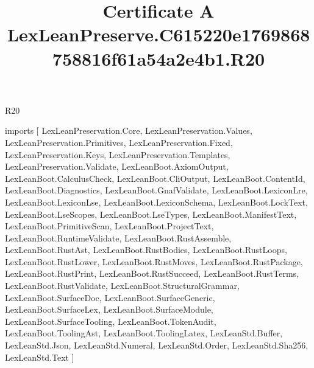 \begin{lexlean}{R20}
\title{Certificate A LexLeanPreserve.C615220e1769868758816f61a54a2e4b1.R20}
\begin{coremodule}
imports [
  LexLeanPreservation.Core,
  LexLeanPreservation.Values,
  LexLeanPreservation.Primitives,
  LexLeanPreservation.Fixed,
  LexLeanPreservation.Keys,
  LexLeanPreservation.Templates,
  LexLeanPreservation.Validate,
  LexLeanBoot.AxiomOutput,
  LexLeanBoot.CalculusCheck,
  LexLeanBoot.CliOutput,
  LexLeanBoot.ContentId,
  LexLeanBoot.Diagnostics,
  LexLeanBoot.GnafValidate,
  LexLeanBoot.LexiconLre,
  LexLeanBoot.LexiconLse,
  LexLeanBoot.LexiconSchema,
  LexLeanBoot.LockText,
  LexLeanBoot.LseScopes,
  LexLeanBoot.LseTypes,
  LexLeanBoot.ManifestText,
  LexLeanBoot.PrimitiveScan,
  LexLeanBoot.ProjectText,
  LexLeanBoot.RuntimeValidate,
  LexLeanBoot.RustAssemble,
  LexLeanBoot.RustAst,
  LexLeanBoot.RustBodies,
  LexLeanBoot.RustLoops,
  LexLeanBoot.RustLower,
  LexLeanBoot.RustMoves,
  LexLeanBoot.RustPackage,
  LexLeanBoot.RustPrint,
  LexLeanBoot.RustSucceed,
  LexLeanBoot.RustTerms,
  LexLeanBoot.RustValidate,
  LexLeanBoot.StructuralGrammar,
  LexLeanBoot.SurfaceDoc,
  LexLeanBoot.SurfaceGeneric,
  LexLeanBoot.SurfaceLex,
  LexLeanBoot.SurfaceModule,
  LexLeanBoot.SurfaceTooling,
  LexLeanBoot.TokenAudit,
  LexLeanBoot.ToolingAst,
  LexLeanBoot.ToolingLatex,
  LexLeanStd.Buffer,
  LexLeanStd.Json,
  LexLeanStd.Numeral,
  LexLeanStd.Order,
  LexLeanStd.Sha256,
  LexLeanStd.Text
]


\end{coremodule}
\end{lexlean}
